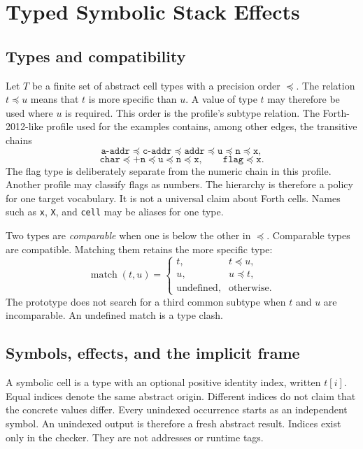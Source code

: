 \documentclass[11pt,a4paper]{article}
\begin{document}
\section{Typed Symbolic Stack Effects}
\label{sec:model}

\subsection{Types and compatibility}

Let $T$ be a finite set of abstract cell types with a precision order
$\preceq$.  The relation $t\preceq u$ means that $t$ is more specific than
$u$.  A value of type $t$ may therefore be used where $u$ is required.  This
order is the profile's subtype relation.  The Forth-2012-like profile used for the examples contains, among
other edges, the transitive chains
\[
 \texttt{a-addr}\preceq\texttt{c-addr}\preceq
 \texttt{addr}\preceq\texttt{u}\preceq\texttt{n}\preceq\texttt{x},
\]
\[
 \texttt{char}\preceq\texttt{+n}\preceq
 \texttt{u}\preceq\texttt{n}\preceq\texttt{x},
 \qquad \texttt{flag}\preceq\texttt{x}.
\]
The flag type is deliberately separate from the numeric chain in this profile.
Another profile may classify flags as numbers.  The hierarchy is therefore a
policy for one target vocabulary.  It is not a universal claim about Forth
cells.  Names such as \texttt{x}, \texttt{X}, and \texttt{cell} may be aliases
for one type.

Two types are \emph{comparable} when one is below the other in $\preceq$.
Comparable types are compatible.  Matching them retains the more specific
type:
\[
 \operatorname{match}(t,u)=
 \begin{cases}
 t,&t\preceq u,\\
 u,&u\preceq t,\\
 \text{undefined},&\text{otherwise}.
 \end{cases}
\]
The prototype does not search for a third common subtype when $t$ and $u$ are
incomparable.  An undefined match is a type clash.

\subsection{Symbols, effects, and the implicit frame}

A symbolic cell is a type with an optional positive identity index, written
$t[i]$.  Equal indices denote the same abstract origin.  Different indices do
not claim that the concrete values differ.  Every unindexed occurrence starts
as an independent symbol.  An unindexed output is therefore a fresh abstract
result.  Indices exist only in the checker.  They are not addresses or runtime
tags.
\end{document}
